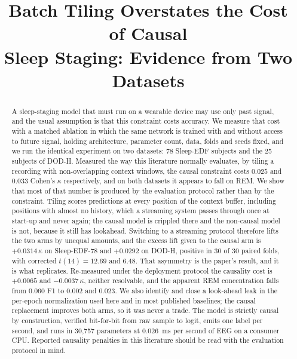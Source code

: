 \documentclass[conference]{IEEEtran}
\begin{document}
\title{Batch Tiling Overstates the Cost of Causal\\Sleep Staging: Evidence from Two Datasets}

\author{
}

\maketitle

\begin{abstract}
A sleep-staging model that must run on a wearable device may use only past signal, and the
usual assumption is that this constraint costs accuracy. We measure that cost with a matched
ablation in which the same network is trained with and without access to future signal,
holding architecture, parameter count, data, folds and seeds fixed, and we run the identical
experiment on two datasets: 78 Sleep-EDF subjects and the 25 subjects of DOD-H. Measured the
way this literature normally evaluates, by tiling a recording with non-overlapping context
windows, the causal constraint costs $0.025$ and $0.033$ Cohen's $\kappa$ respectively, and
on both datasets it appears to fall on REM. We show that most of that number is produced by
the evaluation protocol rather than by the constraint. Tiling scores predictions at every
position of the context buffer, including positions with almost no history, which a streaming
system passes through once at start-up and never again; the causal model is crippled there
and the non-causal model is not, because it still has lookahead. Switching to a streaming
protocol therefore lifts the two arms by unequal amounts, and the excess lift given to the
causal arm is $+0.0314\,\kappa$ on Sleep-EDF-78 and $+0.0292$ on DOD-H, positive in 30 of 30
paired folds, with corrected $t(14) = 12.69$ and $6.48$. That asymmetry is the paper's result,
and it is what replicates. Re-measured under the deployment protocol the causality cost is
$+0.0065$ and $-0.0037\,\kappa$, neither resolvable, and the apparent REM concentration
falls from $0.060$ F1 to $0.002$ and $0.023$. We also identify and close a look-ahead leak in
the per-epoch normalization used here and in most published baselines; the causal replacement
improves both arms, so it was never a trade. The model is strictly causal by construction,
verified bit-for-bit from raw sample to logit, emits one label per second, and runs in
30{,}757 parameters at $0.026$~ms per second of EEG on a consumer CPU. Reported causality
penalties in this literature should be read with the evaluation protocol in mind.
\end{abstract}
\end{document}
